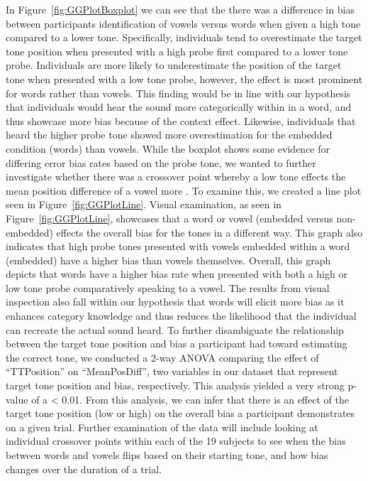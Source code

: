 \documentclass[
  man]{apa6}
\begin{document}
In Figure~\ref{fig:GGPlotBoxplot} we can see that the there was a difference in bias between participants identification of vowels versus words when given a high tone compared to a lower tone. Specifically, individuals tend to overestimate the target tone position when presented with a high probe first compared to a lower tone probe. Individuals are more likely to underestimate the position of the target tone when presented with a low tone probe, however, the effect is most prominent for words rather than vowels. This finding would be in line with our hypothesis that individuals would hear the sound more categorically within in a word, and thus showcase more bias because of the context effect. Likewise, individuals that heard the higher probe tone showed more overestimation for the embedded condition (words) than vowels. While the boxplot shows some evidence for differing error bias rates based on the probe tone, we wanted to further investigate whether there was a crossover point whereby a low tone effects the mean position difference of a vowel more . To examine this, we created a line plot seen in Figure~\ref{fig:GGPlotLine}. Visual examination, as seen in Figure~\ref{fig:GGPlotLine}, showcases that a word or vowel (embedded versus non-embedded) effects the overall bias for the tones in a different way. This graph also indicates that high probe tones presented with vowels embedded within a word (embedded) have a higher bias than vowels themselves. Overall, this graph depicts that words have a higher bias rate when presented with both a high or low tone probe comparatively speaking to a vowel. The results from visual inspection also fall within our hypothesis that words will elicit more bias as it enhances category knowledge and thus reduces the likelihood that the individual can recreate the actual sound heard. To further disambiguate the relationship between the target tone position and bias a participant had toward estimating the correct tone, we conducted a 2-way ANOVA comparing the effect of ``TTPosition'' on ``MeanPosDiff'', two variables in our dataset that represent target tone position and bias, respectively. This analysis yielded a very strong p-value of a \textless{} 0.01. From this analysis, we can infer that there is an effect of the target tone position (low or high) on the overall bias a participant demonstrates on a given trial. Further examination of the data will include looking at individual crossover points within each of the 19 subjects to see when the bias between words and vowels flips based on their starting tone, and how bias changes over the duration of a trial.
\end{document}
